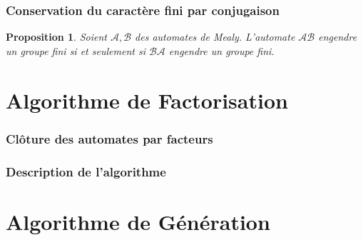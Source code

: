 \documentclass[11pt]{beamer}
\newtheorem{prop}{Proposition}
\begin{document}
	\begin{frame}
		\frametitle{Conservation du caractère fini par conjugaison}
		
		\begin{prop} %
			Soient $\mathcal{A}, \mathcal{B}$ des automates de Mealy.
			L'automate $\mathcal{A}\mathcal{B}$ engendre un groupe fini si et seulement si $\mathcal{B}\mathcal{A}$ engendre un groupe fini.
		\end{prop}
	\end{frame}

	\section{Algorithme de Factorisation}
	
	\begin{frame}
		\frametitle{Clôture des automates par facteurs}
	\end{frame}

	\begin{frame}
		\frametitle{Description de l'algorithme}
	\end{frame}

	\section{Algorithme de Génération}
	
\end{document}
